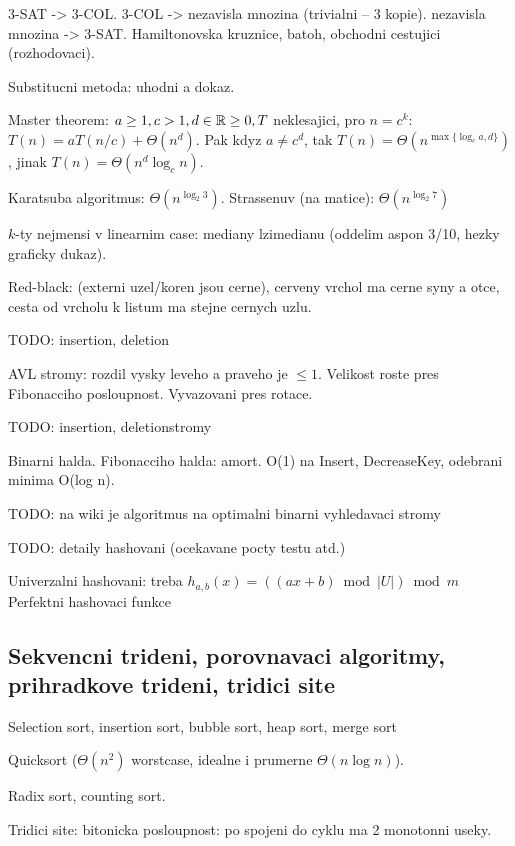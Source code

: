 3-SAT -> 3-COL.
3-COL -> nezavisla mnozina (trivialni -- 3 kopie).
nezavisla mnozina -> 3-SAT.
Hamiltonovska kruznice, batoh, obchodni cestujici (rozhodovaci).

Substitucni metoda: uhodni a dokaz.

Master theorem: $a\geq 1, c>1, d\in\mathbb{R}\geq 0, T$ neklesajici, pro $n=c^k$:
$T(n)=aT(n/c)+\Theta(n^d)$. Pak kdyz $a\neq c^d$, tak
$T(n)=\Theta(n^{\max\{\log_c a, d\}})$, jinak $T(n)=\Theta(n^d \log_c n)$.

Karatsuba algoritmus: $\Theta(n^{\log_2 3})$.
Strassenuv (na matice): $\Theta(n^{\log_2 7})$

\begin{understood}
$k$-ty nejmensi v linearnim case: mediany lzimedianu (oddelim aspon 3/10,
hezky graficky dukaz).
\end{understood}

Red-black: (externi uzel/koren jsou cerne), cerveny vrchol ma cerne
syny a otce, cesta od vrcholu k listum ma stejne cernych uzlu.

TODO: insertion, deletion

AVL stromy: rozdil vysky leveho a praveho je $\leq 1$.
Velikost roste pres Fibonacciho posloupnost.
Vyvazovani pres rotace.

TODO: insertion, deletionstromy

\begin{understood}
Binarni halda. Fibonacciho halda: amort. O(1) na Insert, DecreaseKey,
odebrani minima O(log n).
\end{understood}

TODO: na wiki je algoritmus na optimalni binarni vyhledavaci stromy

TODO: detaily hashovani (ocekavane pocty testu atd.)

Univerzalni hashovani: treba $h_{a,b}(x)=((ax+b)\bmod |U|) \bmod m$
Perfektni hashovaci funkce

\subsection{Sekvencni trideni, porovnavaci algoritmy, prihradkove trideni,
tridici site}
\begin{understood}
Selection sort, insertion sort, bubble sort, heap sort, merge sort
\end{understood}
Quicksort ($\Theta(n^2)$ worstcase, idealne i prumerne $\Theta(n\log n)$).

Radix sort, counting sort.

Tridici site: bitonicka posloupnost: po spojeni do cyklu ma 2 monotonni useky.

